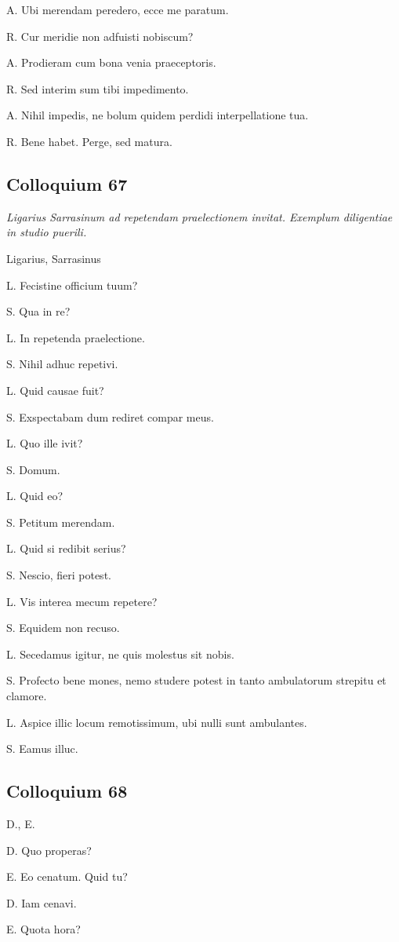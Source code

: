 \documentclass{article}
\begin{document}
A. Ubi merendam peredero, ecce me paratum.

R. Cur meridie non adfuisti nobiscum?

A. Prodieram cum bona venia praeceptoris.

R. Sed interim sum tibi impedimento.

A. Nihil impedis, ne bolum quidem perdidi interpellatione tua.

R. Bene habet. Perge, sed matura.

\subsection{Colloquium 67}
\emph{Ligarius Sarrasinum ad repetendam praelectionem invitat. Exemplum diligentiae in studio puerili.}

Ligarius, Sarrasinus

L. Fecistine officium tuum?

S. Qua in re?

L. In repetenda praelectione.

S. Nihil adhuc repetivi.

L. Quid causae fuit?

S. Exspectabam dum rediret compar meus.

L. Quo ille ivit?

S. Domum.

L. Quid eo?

S. Petitum merendam.

L. Quid si redibit serius?

S. Nescio, fieri potest.

L. Vis interea mecum repetere?

S. Equidem non recuso.

L. Secedamus igitur, ne quis molestus sit nobis.

S. Profecto bene mones, nemo studere potest in tanto ambulatorum strepitu et clamore.

L. Aspice illic locum remotissimum, ubi nulli sunt ambulantes.

S. Eamus illuc.

\subsection{Colloquium 68}
D., E.

D. Quo properas?

E. Eo cenatum. Quid tu?

D. Iam cenavi.

E. Quota hora?
\end{document}
